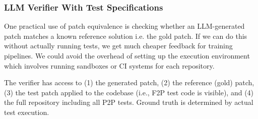 \documentclass[]{meta}
\begin{document}
\subsubsection{LLM Verifier With Test Specifications}
\label{sec:verifier}

One practical use of patch equivalence is checking whether an LLM-generated patch matches a known reference solution i.e. the gold patch. If we can do this without actually running tests, we get much cheaper feedback for training pipelines. We could avoid the overhead of setting up the execution environment which involves running sandboxes or CI systems for each repository.

The verifier has access to (1) the generated patch, (2) the reference (gold) patch, (3) the test patch applied to the codebase (i.e., F2P test code is visible), and (4) the full repository including all P2P tests. Ground truth is determined by actual test execution.
\end{document}

